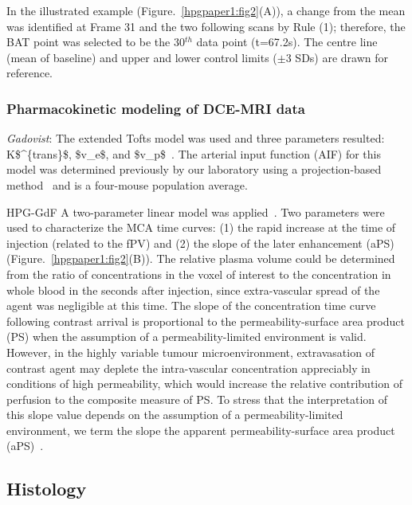 In the illustrated example (Figure.~\ref{hpgpaper1:fig2}(A)), a change from the mean was identified at Frame 31 and the two following scans by Rule (1); therefore, the \acs{BAT} point was selected to be the 30$^{th}$ data point (t=67.2s).
The centre line (mean of baseline) and upper and lower control limits ($\pm$3 SDs) are drawn for reference.

\subsubsection{Pharmacokinetic modeling of DCE-MRI data}

\textit{Gadovist}: The extended Tofts model was used and three parameters resulted: \acs{K$^{trans}$}, \acs{$v_e$}, and \acs{$v_p$}~\cite{Sourbron:2011ce}.
The arterial input function (AIF) for this model was determined previously by our laboratory using a projection-based method~\cite{Moroz:2013ee} and is a four-mouse population average.

\acs{HPG-GdF} A two-parameter linear model was applied~\cite{Pathak:2005gu}.
Two parameters were used to characterize the \acs{MCA} time curves: (1) the rapid increase at the time of injection (related to the \acs{fPV}) and (2) the slope of the later enhancement (\acs{aPS}) (Figure.~\ref{hpgpaper1:fig2}(B)).
The relative plasma volume could be determined from the ratio of concentrations in the voxel of interest to the concentration in whole blood in the seconds after injection, since extra-vascular spread of the agent was negligible at this time.
The slope of the concentration time curve following contrast arrival is proportional to the permeability-surface area product (\acs{PS}) when the assumption of a permeability-limited environment is valid.
However, in the highly variable tumour microenvironment, extravasation of contrast agent may deplete the intra-vascular concentration appreciably in conditions of high permeability, which would increase the relative contribution of perfusion to the composite measure of \acs{PS}.
To stress that the interpretation of this slope value depends on the assumption of a permeability-limited environment, we term the slope the apparent permeability-surface area product (\acs{aPS})~\cite{DaldrupLink:2004gy,Dafni:2002kb}.

\subsection{Histology}

